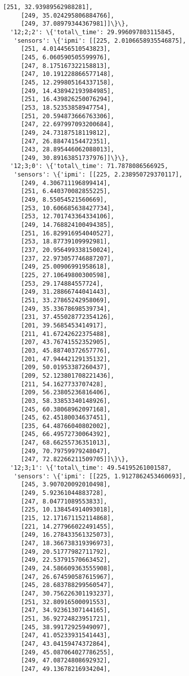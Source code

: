 \documentclass[11pt]{article}
\begin{document}
\begin{tcolorbox}[breakable, size=fbox, boxrule=.5pt, pad at break*=1mm, opacityfill=0]
\begin{Verbatim}[commandchars=\\\{\}]
     [251, 32.93989562988281],
     [249, 35.024295806884766],
     [249, 37.08979344367981]]\}\},
  '12;2;2': \{'total\_time': 29.996097803115845,
   'sensors': \{'ipmi': [[225, 2.0106658935546875],
     [251, 4.014456510543823],
     [245, 6.060590505599976],
     [247, 8.175167322158813],
     [247, 10.191228866577148],
     [245, 12.299805164337158],
     [249, 14.438942193984985],
     [251, 16.439826250076294],
     [253, 18.52353858947754],
     [251, 20.594873666763306],
     [247, 22.697997093200684],
     [249, 24.73187518119812],
     [247, 26.88474154472351],
     [243, 28.895446062088013],
     [249, 30.89163851737976]]\}\},
  '12;3;0': \{'total\_time': 71.7878086566925,
   'sensors': \{'ipmi': [[225, 2.238950729370117],
     [249, 4.306711196899414],
     [251, 6.440370082855225],
     [249, 8.55054521560669],
     [253, 10.606685638427734],
     [253, 12.701743364334106],
     [249, 14.768824100494385],
     [251, 16.829916954040527],
     [253, 18.87739109992981],
     [237, 20.956499338150024],
     [237, 22.973057746887207],
     [249, 25.00906991958618],
     [225, 27.10649800300598],
     [253, 29.174884557724],
     [249, 31.28866744041443],
     [251, 33.27865242958069],
     [249, 35.33678698539734],
     [231, 37.455028772354126],
     [201, 39.5685453414917],
     [211, 41.67242622375488],
     [207, 43.76741552352905],
     [203, 45.88740372657776],
     [201, 47.94442129135132],
     [209, 50.01953387260437],
     [209, 52.123801708221436],
     [211, 54.1627733707428],
     [209, 56.23805236816406],
     [203, 58.33853340148926],
     [245, 60.38068962097168],
     [245, 62.45180034637451],
     [235, 64.48766040802002],
     [245, 66.49572730064392],
     [247, 68.66255736351013],
     [249, 70.79759979248047],
     [247, 72.82266211509705]]\}\},
  '12;3;1': \{'total\_time': 49.54195261001587,
   'sensors': \{'ipmi': [[225, 1.9127862453460693],
     [245, 3.907020092010498],
     [249, 5.92361044883728],
     [247, 8.04771089553833],
     [225, 10.138454914093018],
     [215, 12.171671152114868],
     [221, 14.277966022491455],
     [249, 16.278433561325073],
     [247, 18.366738319396973],
     [249, 20.51777982711792],
     [249, 22.53791570663452],
     [249, 24.586609363555908],
     [247, 26.674590587615967],
     [245, 28.683788299560547],
     [247, 30.756226301193237],
     [251, 32.80916500091553],
     [247, 34.92361307144165],
     [251, 36.92724823951721],
     [245, 38.99172925949097],
     [247, 41.05233931541443],
     [247, 43.04159474372864],
     [249, 45.087064027786255],
     [249, 47.08724808692932],
     [247, 49.13678216934204],

\end{Verbatim}
\end{tcolorbox}
\end{document}
